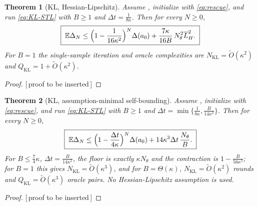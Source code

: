 \documentclass[11pt]{article}
\theoremstyle{plain}
\newtheorem{theorem}{Theorem}[section]
\theoremstyle{definition}
\theoremstyle{remark}
\newcommand{\E}{\mathbb{E}}
\newcommand{\KL}{\mathrm{KL}}
\newcommand{\barLH}{\overline{L}_H}
\newcommand{\PROOFHOLE}{{\color{red}\textsf{[\,proof to be inserted\,]}}}
\begin{document}
\begin{theorem}[KL, Hessian-Lipschitz]
\label{thm:KL-Hlip}
Assume , initialize with \eqref{eq:rescue},
and run \eqref{eq:KL-STL} with $B\geq1$ and $\Delta t=\tfrac1{8\kappa}$. Then for every $N\geq0$,
\begin{equation}
\label{eq:KL-Hlip}
    \boxed{\;
    \E\Delta_N\leq\Bigl(1-\frac1{16\kappa^2}\Bigr)^N\Delta(a_0)+\frac{7\kappa}{16B}\,N_\theta^2\barLH^2 .
    \;}
\end{equation}
For $B=1$ the single-sample iteration and oracle complexities are $N_{\KL}=\widetilde O(\kappa^2)$ and
$Q_{\KL}=1+\widetilde O(\kappa^2)$.
\end{theorem}

\begin{proof}
\PROOFHOLE
\end{proof}

\begin{theorem}[KL, assumption-minimal self-bounding]
\label{thm:KL-selfbound}
Assume , initialize with \eqref{eq:rescue}, and run \eqref{eq:KL-STL}
with $B\geq1$ and $\Delta t=\min\{\tfrac1{8\kappa},\tfrac B{14\kappa^2}\}$. Then for every $N\geq0$,
\begin{equation}
\label{eq:KL-selfbound}
    \boxed{\;
    \E\Delta_N\leq\Bigl(1-\frac{\Delta t}{4\kappa}\Bigr)^N\Delta(a_0)+14\kappa^3\Delta t\,\frac{N_\theta}B .
    \;}
\end{equation}
For $B\leq\tfrac74\kappa$, $\Delta t=\tfrac B{14\kappa^2}$, the floor is exactly $\kappa N_\theta$ and
the contraction is $1-\tfrac B{56\kappa^3}$; for $B=1$ this gives $N_{\KL}=\widetilde O(\kappa^3)$, and
for $B=\Theta(\kappa)$, $N_{\KL}=\widetilde O(\kappa^2)$ rounds and $Q_{\KL}=\widetilde O(\kappa^3)$
oracle pairs. No Hessian-Lipschitz assumption is used.
\end{theorem}

\begin{proof}
\PROOFHOLE
\end{proof}
\end{document}
